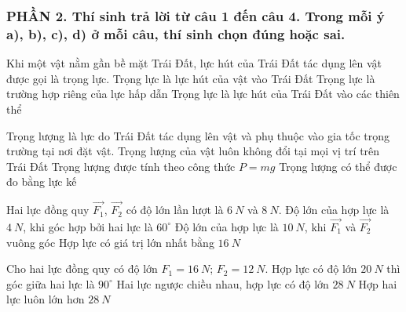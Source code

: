 \subsubsection*{PHẦN 2. Thí sinh trả lời từ câu 1 đến câu 4. Trong mỗi ý a), b), c), d) ở mỗi câu, thí sinh chọn đúng hoặc sai.}
\setcounter{ex}{0}

\begin{ex}%
Khi một vật nằm gần bề mặt Trái Đất, lực hút của Trái Đất tác dụng lên vật được gọi là trọng lực.
{Trọng lực là lực hút của vật vào Trái Đất}
{\True Trọng lực là trường hợp riêng của lực hấp dẫn}
{Trọng lực là lực hút của Trái Đất vào các thiên thể}
\loigiai{ 
\begin{itemchoice}
\itemch 
\itemch 
\itemch 
\itemch 
\end{itemchoice}
}
 \end{ex}
\begin{ex}%
Trọng lượng là lực do Trái Đất tác dụng lên vật và phụ thuộc vào gia tốc trọng trường tại nơi đặt vật.
{Trọng lượng của vật luôn không đổi tại mọi vị trí trên Trái Đất}
{\True Trọng lượng được tính theo công thức $P=mg$}
{\True Trọng lượng có thể được đo bằng lực kế}
\loigiai{
\begin{itemchoice}
\itemch 
\itemch 
\itemch 
\itemch 
\end{itemchoice}
}
 \end{ex}
\begin{ex}
Hai lực đồng quy $\vec{F_1}$, $\vec{F_2}$ có độ lớn lần lượt là $6\ N$ và $8\ N$.
{Độ lớn của hợp lực là $4\ N$, khi góc hợp bởi hai lực là $60^\circ$}
{\True Độ lớn của hợp lực là $10\ N$, khi $\vec{F_1}$ và  $\vec{F_2}$ vuông góc}
{Hợp lực có giá trị lớn nhất bằng $16\ N$}
\loigiai{
\begin{itemchoice}
\itemch
\itemch
\itemch
\itemch
\end{itemchoice}}
\end{ex}
\begin{ex}
Cho hai lực đồng quy có độ lớn $F_1=16\ N$; $F_2=12\ N$.
{\True Hợp lực có độ lớn $20\ N$ thì góc giữa hai lực là $90^\circ$}
{Hai lực ngược chiều nhau, hợp lực có độ lớn $28\ N$}
{Hợp hai lực luôn lớn hơn $28\ N$}
\loigiai{
\begin{itemchoice}
\itemch
\itemch
\itemch
\itemch
\end{itemchoice}}
\end{ex}





















